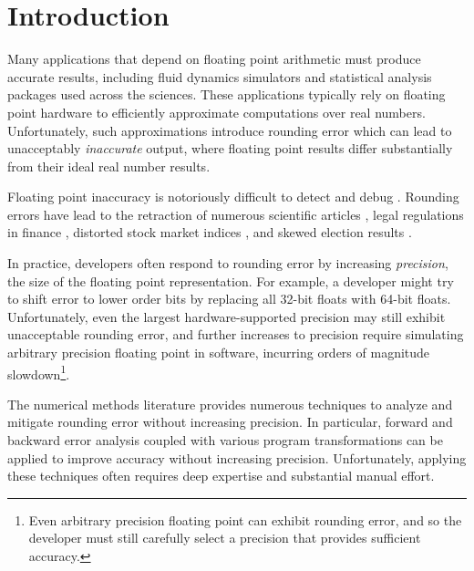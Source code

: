\documentclass[paper.tex]{subfiles}
\begin{document}
\section{Introduction}
\label{sec:introduction}

Many applications that depend on floating point arithmetic must
produce accurate results, including fluid dynamics simulators and
statistical analysis packages used across the sciences.  These
applications typically rely on floating point hardware to efficiently
approximate computations over real numbers.  Unfortunately, such
approximations introduce rounding error which can lead to unacceptably
\textit{inaccurate} output, where floating point results differ
substantially from their ideal real number results.


Floating point inaccuracy is notoriously difficult to detect and debug
.  Rounding errors have lead to the retraction of
numerous scientific articles , legal regulations in finance
, distorted stock market indices , and skewed
election results .

In practice, developers often respond to rounding error by increasing
\textit{precision}, the size of the floating point representation.
For example, a developer might try to shift error to lower order bits
by replacing all 32-bit floats with 64-bit floats.  Unfortunately,
even the largest hardware-supported precision may still exhibit
unacceptable rounding error, and further increases to precision
require simulating arbitrary precision floating point in software,
incurring orders of magnitude slowdown\footnote{Even arbitrary
  precision floating point can exhibit rounding error, and so the
  developer must still carefully select a precision that provides
  sufficient accuracy.}.

 The numerical methods literature provides numerous
techniques to analyze and mitigate rounding error without increasing
precision.  In
particular, forward and backward error analysis  coupled
with various program transformations  can be applied to
improve accuracy without increasing precision.  Unfortunately,
applying these techniques often requires deep expertise and
substantial manual effort.
\end{document}
